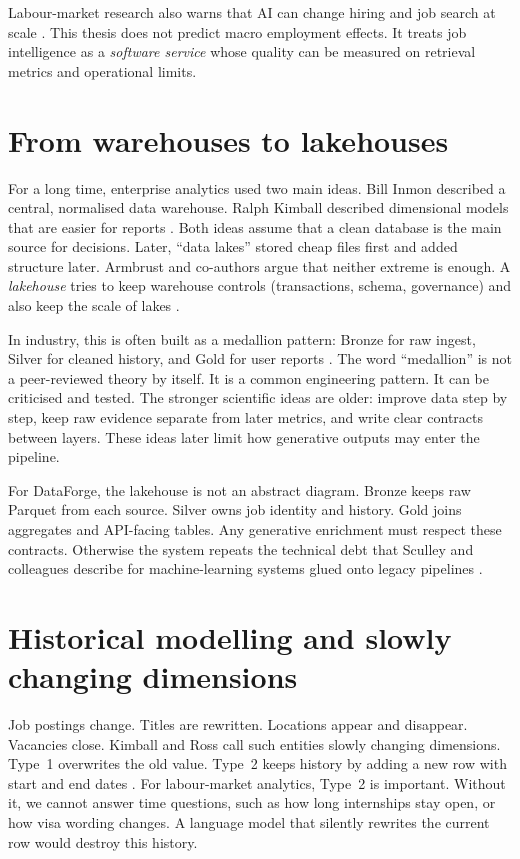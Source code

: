 Labour-market research also warns that AI can change hiring and job search at scale . This thesis does not predict macro employment effects. It treats job intelligence as a \emph{software service} whose quality can be measured on retrieval metrics and operational limits.

\section{From warehouses to lakehouses}
\label{sec:lakehouse}

For a long time, enterprise analytics used two main ideas. Bill Inmon described a central, normalised data warehouse. Ralph Kimball described dimensional models that are easier for reports . Both ideas assume that a clean database is the main source for decisions. Later, ``data lakes'' stored cheap files first and added structure later. Armbrust and co-authors argue that neither extreme is enough. A \emph{lakehouse} tries to keep warehouse controls (transactions, schema, governance) and also keep the scale of lakes .

In industry, this is often built as a medallion pattern: Bronze for raw ingest, Silver for cleaned history, and Gold for user reports . The word ``medallion'' is not a peer-reviewed theory by itself. It is a common engineering pattern. It can be criticised and tested. The stronger scientific ideas are older: improve data step by step, keep raw evidence separate from later metrics, and write clear contracts between layers. These ideas later limit how generative outputs may enter the pipeline.

For DataForge, the lakehouse is not an abstract diagram. Bronze keeps raw Parquet from each source. Silver owns job identity and history. Gold joins aggregates and API-facing tables. Any generative enrichment must respect these contracts. Otherwise the system repeats the technical debt that Sculley and colleagues describe for machine-learning systems glued onto legacy pipelines .

\section{Historical modelling and slowly changing dimensions}
\label{sec:scd}

Job postings change. Titles are rewritten. Locations appear and disappear. Vacancies close. Kimball and Ross call such entities slowly changing dimensions. Type~1 overwrites the old value. Type~2 keeps history by adding a new row with start and end dates . For labour-market analytics, Type~2 is important. Without it, we cannot answer time questions, such as how long internships stay open, or how visa wording changes. A language model that silently rewrites the current row would destroy this history.

